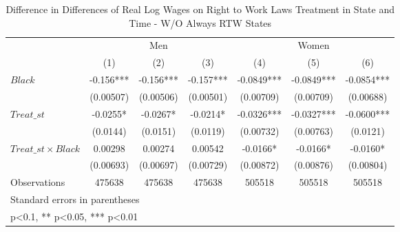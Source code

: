 \begin{table}[htbp]\centering
\def\sym#1{\ifmmode^{#1}\else\(^{#1}\)\fi}
\caption{Difference in Differences of Real Log Wages on Right to Work Laws Treatment in State and Time - W/O Always RTW States}
\begin{tabular}{l*{6}{c}}
\hline\hline
                    &\multicolumn{3}{c}{Men}                        &\multicolumn{3}{c}{Women}                      \\\cmidrule(lr){2-4}\cmidrule(lr){5-7}
                    &\multicolumn{1}{c}{(1)}   &\multicolumn{1}{c}{(2)}   &\multicolumn{1}{c}{(3)}   &\multicolumn{1}{c}{(4)}   &\multicolumn{1}{c}{(5)}   &\multicolumn{1}{c}{(6)}   \\
\hline
$ Black $           &      -0.156***&      -0.156***&      -0.157***&     -0.0849***&     -0.0849***&     -0.0854***\\
                    &   (0.00507)   &   (0.00506)   &   (0.00501)   &   (0.00709)   &   (0.00709)   &   (0.00688)   \\
[1em]
$ Treat\_{st} $      &     -0.0255*  &     -0.0267*  &     -0.0214*  &     -0.0326***&     -0.0327***&     -0.0600***\\
                    &    (0.0144)   &    (0.0151)   &    (0.0119)   &   (0.00732)   &   (0.00763)   &    (0.0121)   \\
[1em]
$ Treat\_{st} \times Black $&     0.00298   &     0.00274   &     0.00542   &     -0.0166*  &     -0.0166*  &     -0.0160*  \\
                    &   (0.00693)   &   (0.00697)   &   (0.00729)   &   (0.00872)   &   (0.00876)   &   (0.00804)   \\
\hline
Observations        &      475638   &      475638   &      475638   &      505518   &      505518   &      505518   \\
\hline\hline
\multicolumn{7}{l}{\footnotesize Standard errors in parentheses}\\
\multicolumn{7}{l}{\footnotesize * p<0.1, ** p<0.05, *** p<0.01}\\
\end{tabular}
\end{table}

